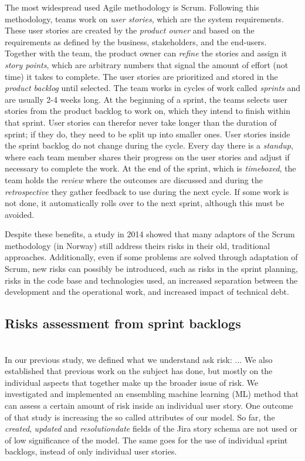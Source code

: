 \documentclass[sigconf]{acmart}
\begin{document}
The most widespread used Agile methodology is Scrum\cite{deemer2010scrum}. 
Following this methodology, teams work on \emph{user stories}, which are the system requirements. 
These user stories are created by the \emph{product owner} and based on the requirements as defined by the business, stakeholders, and the end-users. 
Together with the team, the product owner can \emph{refine} the stories and assign it \emph{story points}, which are arbitrary numbers that signal the amount of effort (not time) it takes to complete. 
The user stories are prioritized and stored in the \emph{product backlog} until selected. 
The team works in cycles of work called \emph{sprints} and are usually 2-4 weeks long. 
At the beginning of a sprint, the teams selects user stories from the product backlog to work on, which they intend to finish within that sprint. 
User stories can therefor never take longer than the duration of sprint; if they do, they need to be split up into smaller ones. 
User stories inside the sprint backlog do not change during the cycle. Every day there is a \emph{standup}, where each team member shares their progress on the user stories and adjust if necessary to complete the work. 
At the end of the sprint, which is \emph{timeboxed}, the team holds the \emph{review} where the outcomes are discussed and during the \emph{retrospective } they gather feedback to use during the next cycle. 
If some work is not done, it automatically rolls over to the next sprint, although this must be avoided.

Despite these benefits, a study in 2014 showed that many adaptors of the Scrum methodology (in Norway) still address theirs risks in their old, traditional approaches.\cite{siddique2014practical} Additionally, even if some problems are solved through adaptation of Scrum, new risks can possibly be introduced, such as risks in the sprint planning, risks in the code base and technologies used, an increased separation between the development and the operational work, and increased impact of technical debt\cite{kruchten2012technical}\cite{walczak2013risks}. \\

\subsection{Risks assessment from sprint backlogs} \\
In our previous study, we defined what we understand ask risk: ...
We also established that previous work on the subject has done, but mostly on the individual aspects that together make up the broader issue of risk. We investigated and implemented an ensembling machine learning (ML) method that can assess a certain amount of risk inside an individual user story. One outcome of that study is increasing the so called attributes of our model. So far, the \emph{created}, \emph{updated} and \emph{resolutiondate} fields of the Jira story schema are not used or of low significance of the model. The same goes for the use of individual sprint backlogs, instead of only individual user stories.
\end{document}
